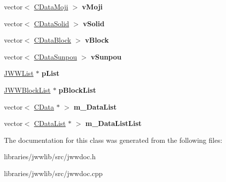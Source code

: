 \begin{DoxyCompactItemize}
\item 
\hypertarget{classJWWDocument_a9893b8156509fd2214669b064780253b}{vector$<$ \hyperlink{classCDataMoji}{C\-Data\-Moji} $>$ {\bfseries v\-Moji}}\label{classJWWDocument_a9893b8156509fd2214669b064780253b}

\item 
\hypertarget{classJWWDocument_a9f87e8dec99c46be57f916fcf234a68c}{vector$<$ \hyperlink{classCDataSolid}{C\-Data\-Solid} $>$ {\bfseries v\-Solid}}\label{classJWWDocument_a9f87e8dec99c46be57f916fcf234a68c}

\item 
\hypertarget{classJWWDocument_ad665f2752ee4cc1c278ff9dbd499176c}{vector$<$ \hyperlink{classCDataBlock}{C\-Data\-Block} $>$ {\bfseries v\-Block}}\label{classJWWDocument_ad665f2752ee4cc1c278ff9dbd499176c}

\item 
\hypertarget{classJWWDocument_a4aeae5fc5cc77a6b25700ccc53de4d6b}{vector$<$ \hyperlink{classCDataSunpou}{C\-Data\-Sunpou} $>$ {\bfseries v\-Sunpou}}\label{classJWWDocument_a4aeae5fc5cc77a6b25700ccc53de4d6b}

\item 
\hypertarget{classJWWDocument_ab316aa943dbeba2452897cbabe03cdf4}{\hyperlink{classJWWList}{J\-W\-W\-List} $\ast$ {\bfseries p\-List}}\label{classJWWDocument_ab316aa943dbeba2452897cbabe03cdf4}

\item 
\hypertarget{classJWWDocument_a817b310c0492c516e7ae018aa2c1affc}{\hyperlink{classJWWBlockList}{J\-W\-W\-Block\-List} $\ast$ {\bfseries p\-Block\-List}}\label{classJWWDocument_a817b310c0492c516e7ae018aa2c1affc}

\item 
\hypertarget{classJWWDocument_a817c1eff65a8069aa853c38610e9b863}{vector$<$ \hyperlink{classCData}{C\-Data} $\ast$ $>$ {\bfseries m\-\_\-\-Data\-List}}\label{classJWWDocument_a817c1eff65a8069aa853c38610e9b863}

\item 
\hypertarget{classJWWDocument_a11a0c539fd0ccd98f55157d5a96fcb87}{vector$<$ \hyperlink{classCDataList}{C\-Data\-List} $\ast$ $>$ {\bfseries m\-\_\-\-Data\-List\-List}}\label{classJWWDocument_a11a0c539fd0ccd98f55157d5a96fcb87}

\end{DoxyCompactItemize}


The documentation for this class was generated from the following files\-:\begin{DoxyCompactItemize}
\item 
libraries/jwwlib/src/jwwdoc.\-h\item 
libraries/jwwlib/src/jwwdoc.\-cpp\end{DoxyCompactItemize}
